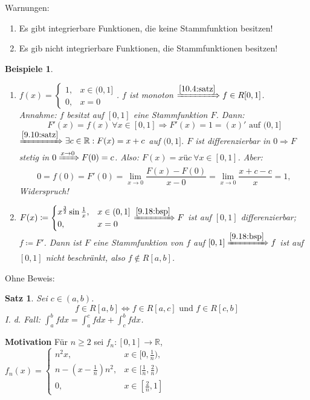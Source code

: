 \documentclass{extreport}
\newcommand{\R}{\mathbb{R}}
\theoremstyle{named}
\theoremstyle{dotless}
\newtheorem{satz}[namedtheorem]{Satz}
\newtheorem*{beispiele}{Beispiele}
\begin{document}
Warnungen:
\begin{enumerate}
	\item Es gibt integrierbare Funktionen, die keine Stammfunktion besitzen!
	\item Es gib nicht integrierbare Funktionen, die Stammfunktionen besitzen!
\end{enumerate}

\begin{beispiele} ~\
	\begin{enumerate}
		\item $f(x) = \begin{cases} 1, & x \in (0, 1] \\ 0, & x = 0 \end{cases}$. %
			$f$ ist monoton $\xRightarrow[]{\ref{10.4:satz}} f \in R[0, 1]$. \\
			Annahme: $f$ besitzt auf $[0, 1]$ eine Stammfunktion $F$. Dann:
			$$ F'(x) = f(x) ~\forall x \in [0, 1] \Rightarrow F'(x) = 1 = (x)' \text{ auf } (0, 1] $$
			$\xRightarrow[]{\ref{9.10:satz}} \exists c \in \R: F(x) = x + c$ auf $(0, 1]$. $F$ ist differenzierbar in $0 \Rightarrow F$ stetig in $0 \xRightarrow[]{x \rightarrow 0} F(0) = c$. Also: $F(x) = x ü c ~\forall x \in [0, 1]$. Aber:
			$$ 0 = f(0) = F'(0) = \lim_{x \rightarrow 0} \frac{F(x) - F(0)}{x - 0} = \lim_{x \rightarrow 0} \frac{x + c - c}{x} = 1, $$
			Widerspruch!
		\item $F(x) \coloneqq \begin{cases} x^{\frac{3}{2}} \sin \frac{1}{x}, & x \in (0, 1] \\ 0, & x = 0 \end{cases} \xRightarrow[]{\ref{9.18:bsp}} F$ ist auf $[0, 1]$ differenzierbar; $f \coloneqq F'$. Dann ist $F$ eine Stammfunktion von $f$ auf $[0, 1] \xRightarrow[]{\ref{9.18:bsp}} f$ ist auf $[0, 1]$ nicht beschränkt, also $f \notin R[a, b]$. 
	\end{enumerate}	
\end{beispiele}

Ohne Beweis:

\begin{satz} \label{10.7:satz}
	Sei $c \in (a, b)$.
	$$  f \in R[a, b] \iff f \in R[a, c] \text{ und } f \in R[c, b] $$	
	I. d. Fall: $\int_{a}^{b} f dx = \int_{a}^{c} f dx + \int_{c}^{b} f dx$. %
\end{satz}


\textbf{Motivation}
Für	$n \geq 2$ sei $f_{n} \colon [0, 1] \rightarrow \R$, $f_{n}(x) = \begin{cases} n^{2} x, & x \in [0, \frac{1}{n}), \\ n - (x - \frac{1}{n}) n^{2}, & x \in [\frac{1}{n}, \frac{2}{n}) \\ 0, & x \in [\frac{2}{n}, 1] \end{cases} $
\end{document}

